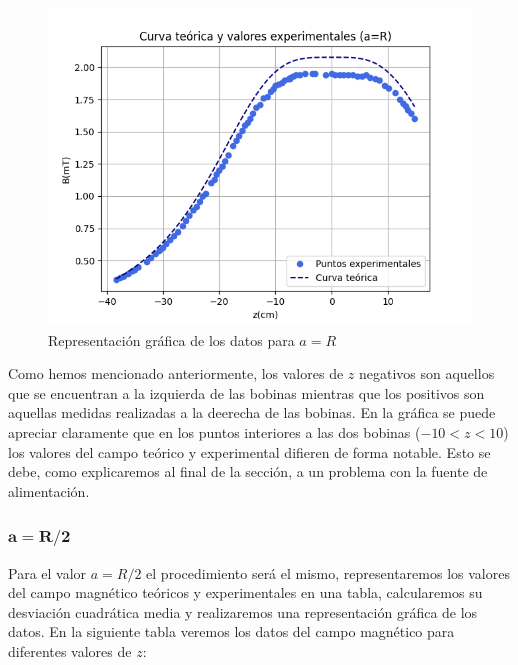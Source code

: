 \documentclass[a4paper,12pt,titlepage]{report}
\begin{document}
\newpage

\begin{figure}[h!]
    \centering
    \includegraphics[width=0.85\linewidth]{Images/CurvaB1.png}
    \caption{Representación gráfica de los datos para $a=R$}
\end{figure}

Como hemos mencionado anteriormente, los valores de $z$ negativos son aquellos que se encuentran a la izquierda de las bobinas mientras que los positivos son aquellas medidas realizadas a la deerecha de las bobinas. En la gráfica se puede apreciar claramente que en los puntos interiores a las dos bobinas ($-10<z<10$) los valores del campo teórico y experimental difieren de forma notable. Esto se debe, como explicaremos al final de la sección, a un problema con la fuente de alimentación.

\subsubsection{$\mathbf{a=R/2}$}

Para el valor $a=R/2$ el procedimiento será el mismo, representaremos los valores del campo magnético teóricos y experimentales en una tabla, calcularemos su desviación cuadrática media y realizaremos una representación gráfica de los datos. En la siguiente tabla veremos los datos del campo magnético para diferentes valores de $z$:

\newpage
\end{document}
